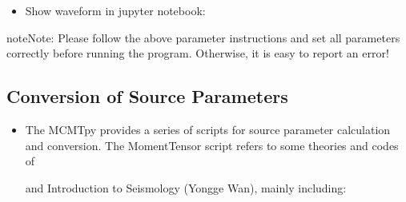 \documentclass[a4paper,10pt,english,openany]{sphinxmanual}
\begin{document}
\begin{itemize}
\item {} 
Show waveform in jupyter notebook:

\begin{sphinxVerbatim}[commandchars=\\\{\}]
  \PYG{p}{[}\PYG{p}{]}
   
\end{sphinxVerbatim}

\end{itemize}


\begin{sphinxadmonition}{note}{Note:}
Please follow the above parameter instructions and set all parameters correctly before running the program.
Otherwise, it is easy to report an error!
\end{sphinxadmonition}


\subsection{Conversion of Source Parameters}
\label{\detokenize{tutorials/S6_Conver_FM:conversion-of-source-parameters}}\label{\detokenize{tutorials/S6_Conver_FM::doc}}\begin{itemize}
\item {} 
The MCMTpy provides a series of scripts for source parameter calculation and conversion. The MomentTensor script refers
to some theories and codes of %
\begin{footnote}[10]\sphinxAtStartFootnote
{}
%
\end{footnote} %
\begin{footnote}[11]\sphinxAtStartFootnote
{}
%
\end{footnote} and
Introduction to Seismology (Yongge Wan), mainly including:

\end{itemize}
\end{document}
